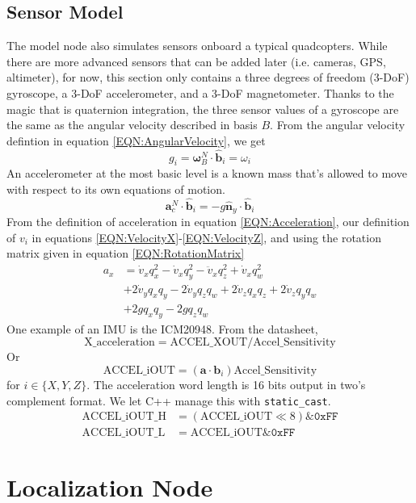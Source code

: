 \documentclass[lettersize,journal]{IEEEtran}
\newcommand*\BitAnd{\mathbin{\&}}
\newcommand*\ShiftLeft{\ll}
\begin{document}
\subsection{Sensor Model}
The model node also simulates sensors onboard a typical quadcopters.
While there are more advanced sensors that can be added later (i.e. cameras, GPS, altimeter), for now, this section only contains a three degrees of freedom (3-DoF) gyroscope, a 3-DoF accelerometer, and a 3-DoF magnetometer.
Thanks to the magic that is quaternion integration, the three sensor values of a gyroscope are the same as the angular velocity described in basis $B$.
From the angular velocity defintion in equation \ref{EQN:AngularVelocity}, we get
\begin{equation}
  g_i = \boldsymbol\omega^N_B \cdot \mathbf{\hat{b}}_i = \omega_i
\end{equation}
An accelerometer at the most basic level is a known mass that's allowed to move with respect to its own equations of motion.
\begin{equation}
  \mathbf{a}^N_c\cdot \mathbf{\hat{b}}_i=-g\mathbf{\hat{n}}_y\cdot\mathbf{\hat{b}}_i
\end{equation}
From the definition of acceleration in equation \ref{EQN:Acceleration}, our definition of $v_i$ in equations \ref{EQN:VelocityX}-\ref{EQN:VelocityZ},  and using the rotation matrix given in equation \ref{EQN:RotationMatrix}
\begin{align}
  a_x &= \dot{v}_xq_x^2-\dot{v}_xq_y^2-\ddot{v}_xq_z^2+\dot{v}_xq_w^2\nonumber\\
  &+2\dot{v}_yq_xq_y-2\dot{v}_yq_zq_w+ 2\dot{v}_z q_xq_z+2\dot{v}_zq_yq_w \nonumber\\
  &+2gq_xq_y-2gq_zq_w
\end{align}
One example of an IMU is the ICM20948. From the datasheet,
\begin{equation}
  \mathrm{X\_acceleration = ACCEL\_XOUT/Accel\_Sensitivity}
\end{equation}
Or
\begin{equation}
  \mathrm{ACCEL\_iOUT} = (\mathbf{a}\cdot\mathbf{b}_i) \mathrm{Accel\_Sensitivity}
\end{equation}
for $i\in \{X, Y, Z\}$. The acceleration word length is 16 bits output in two's complement format. We let C++ manage this with \texttt{static\_cast}.
\begin{align}
  \mathrm{ACCEL\_iOUT\_H} &= (\mathrm{ACCEL\_iOUT} \ShiftLeft 8) \BitAnd
  \mathtt{0xFF} \\
  \mathrm{ACCEL\_iOUT\_L} &= \mathrm{ACCEL\_iOUT} \BitAnd \mathtt{0xFF}
\end{align}



\section{Localization Node}
\end{document}
